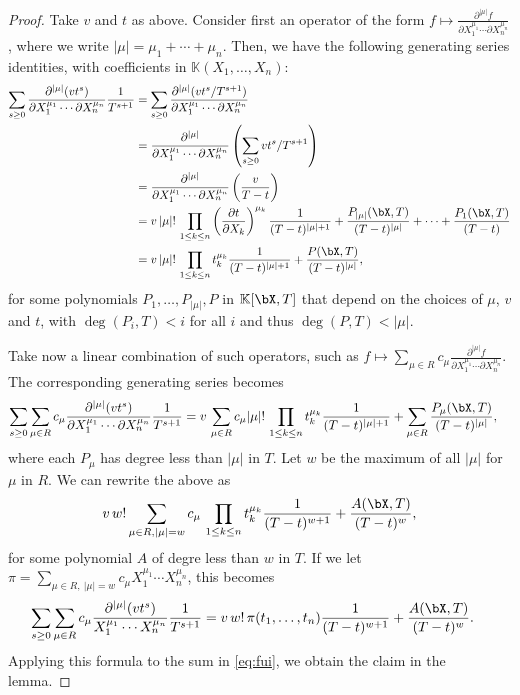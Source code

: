 \documentclass[12pt]{article}
\def\K{\mathbb{K}}
\def\K {\ensuremath{\mathbb{K}}}
\begin{document}
\begin{proof}
	Take $v$ and $t$ as above. Consider first
	an operator of the form $f \mapsto \frac{ \partial^{|\mu|}  f}
	{\partial X_1^{\mu_1} \cdots \partial X_n^{\mu_n}}$, where 
	we write $|\mu|=\mu_1+\cdots+\mu_n$. Then, we have
	the following generating series identities, with coefficients in 
	$\K(X_1,\dots,X_n)$:
	\begin{align*}
	\sum_{s \ge 0} 
	\frac{ \partial^{|\mu|} ( v t^s )} {\partial X_1^{\mu_1} \cdots
		\partial X_n^{\mu_n}}
	\frac{1}{T^{s+1}} 
	&=  \sum_{s \ge 0} 
	\frac{ \partial^{|\mu|} (v t^s/T^{s+1})} {\partial X_1^{\mu_1} \cdots
		\partial X_n^{\mu_n}}\\
	&=  
	\frac{ \partial^{|\mu|} } {\partial X_1^{\mu_1} \cdots
		\partial X_n^{\mu_n}}
	\left (\sum_{s \ge 0} v t^s/T^{s+1}\right ) \\
	&= \frac{ \partial^{|\mu|} } {\partial X_1^{\mu_1} \cdots
		\partial X_n^{\mu_n}}
	\left (\frac v{T-t} \right ) \\
	&= v\, |\mu|!\, \prod_{1 \le k \le n} 
	\left (\frac{ \partial t} {\partial X_k} \right)^{\mu_k}
	\frac {1}{(T-t)^{|\mu|+1}} + \frac{P_{|\mu|}(\bX,T)}{(T-t)^{|\mu|}} + \cdots + \frac{P_{1}(\bX,T)}{(T-t)}\\
	&= v\, |\mu|!\, \prod_{1 \le k \le n} 
	t_k^{\mu_k}
	\frac {1}{(T-t)^{|\mu|+1}} + \frac{P(\bX,T)}{(T-t)^{|\mu|}},
	\end{align*}
	for some polynomials $P_1,\dots,P_{|\mu|},P$ in $\K[\bX,T]$ that
	depend on the choices of $\mu$, $v$ and $t$, with $\deg(P_i,T) < i$
	for all $i$ and thus $\deg(P,T) < |\mu|$.
	
	Take now a linear combination of such operators, such as 
	$f \mapsto \sum_{\mu \in R} c_\mu \frac{ \partial^{|\mu|}  f } {\partial X_1^{\mu_1} \cdots
		\partial X_n^{\mu_n}}$. The corresponding generating series
	becomes
	\begin{align*}
	\sum_{s \ge 0} 
	\sum_{\mu \in R} c_\mu \frac{ \partial^{|\mu|} ( v t^s )} {\partial X_1^{\mu_1} \cdots
		\partial X_n^{\mu_n}}
	\frac{1}{T^{s+1}}
	&=
	v\,\sum_{\mu \in R} c_\mu
	|\mu|!\, \prod_{1 \le k \le n} 
	t_k^{\mu_k}
	\frac {1}{(T-t )^{|\mu|+1}} +\sum_{\mu \in R} \frac{P_\mu(\bX,T)}{(T-t)^{|\mu|}},
	\end{align*}
	where each $P_\mu$ has degree less than $|\mu|$ in $T$.
	Let $w$ be the maximum of all $|\mu|$ for $\mu$ in $R$. We can rewrite 
	the above as
	\begin{align*}
	v\, w! 
	\sum_{\mu \in R, |\mu|=w} c_\mu
	\, \prod_{1 \le k \le n} 
	t_k^{\mu_k}
	\frac {1}{(T-t )^{w+1}}
	+ \frac{A(\bX,T)}{(T-t )^{w}},
	\end{align*}
	for some polynomial $A$ of degre less than $w$ in $T$. If we let 
	$\pi =\sum_{\mu \in R,\ |\mu|=w} c_{\mu} X_1^{\mu_1} \cdots
	X_n^{\mu_n}$, this becomes
	\begin{align*}
	\sum_{s \ge 0} 
	\sum_{\mu \in R} c_\mu \frac{ \partial^{|\mu|} ( v t^s )} { X_1^{\mu_1} \cdots
		X_n^{\mu_n}}
	\frac{1}{T^{s+1}} 
	&=
	v\, w! \,  \pi(t_1,\dots,t_n)
	\frac {1}{(T-t )^{w+1}}
	+ \frac{A(\bX,T)}{(T-t )^{w}}.
	\end{align*}
	Applying this formula to the sum in \cref{eq:fui}, we obtain the
	claim in the lemma.
\end{proof}
\end{document}
